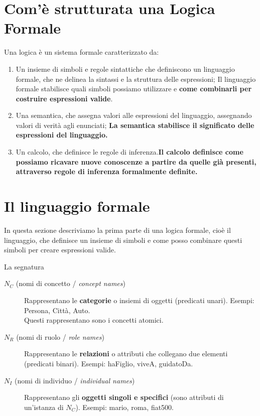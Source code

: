 \section{Com'è strutturata una Logica Formale}
Una logica è un sistema formale caratterizzato da:
\begin{enumerate}
    \item Un insieme di simboli e regole sintattiche che definiscono un linguaggio formale, che
ne delinea la sintassi e la struttura delle espressioni; Il linguaggio formale stabilisce quali simboli possiamo utilizzare e \textbf{come combinarli per costruire espressioni valide}.
    \item  Una semantica, che assegna valori alle espressioni del linguaggio, assegnando valori
di verità agli enunciati; \textbf{La semantica stabilisce il significato delle espressioni del linguaggio.}
    \item Un calcolo, che definisce le regole di inferenza.\textbf{Il calcolo definisce come possiamo ricavare nuove conoscenze a partire da quelle già presenti, attraverso regole di inferenza formalmente definite.}
\end{enumerate}


\newpage
\section{Il linguaggio formale}
In questa sezione descriviamo la prima parte di una logica formale, cioè il linguaggio, che definisce un insieme di simboli e come posso combinare questi simboli per creare espressioni valide.

\begin{definition}{La segnatura}
    \begin{description}
        \item[\(N_C\) (nomi di concetto / \emph{concept names})]\hfill\break
            Rappresentano le \textbf{categorie} o insiemi di oggetti
            (predicati unari). Esempi: \textsf{Persona}, \textsf{Città},
            \textsf{Auto}. \\
            Questi rappresentano sono i concetti atomici.
        \item[\(N_R\) (nomi di ruolo / \emph{role names})]\hfill\break
            Rappresentano le \textbf{relazioni} o attributi che collegano
            due elementi (predicati binari). Esempi: \textsf{haFiglio},
            \textsf{viveA}, \textsf{guidatoDa}.
        \item[\(N_I\) (nomi di individuo / \emph{individual names})]\hfill\break
            Rappresentano gli \textbf{oggetti singoli e specifici}
            (sono attributi di un'istanza di \(N_C\)).
            Esempi: \textsf{mario}, \textsf{roma}, \textsf{fiat500}.
    \end{description}
\end{definition}

